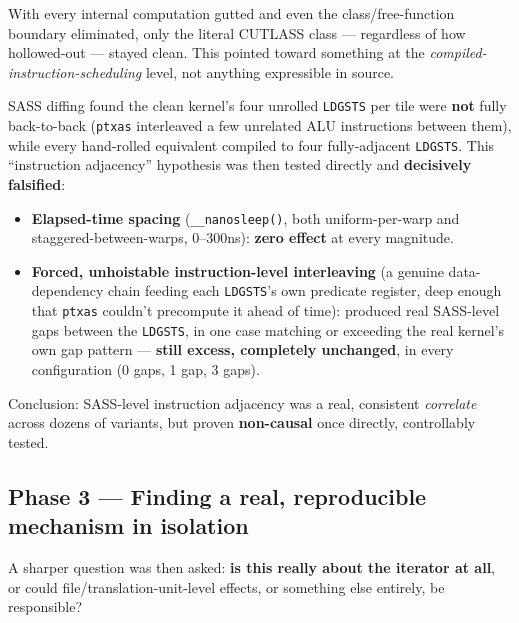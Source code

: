 \documentclass[11pt]{article}
\begin{document}
With every internal computation gutted and even the class/free-function boundary eliminated, only the literal CUTLASS class --- regardless of how hollowed-out --- stayed clean. This pointed toward something at the \emph{compiled-instruction-scheduling} level, not anything expressible in source.

SASS diffing found the clean kernel's four unrolled \texttt{LDGSTS} per tile were \textbf{not} fully back-to-back (\texttt{ptxas} interleaved a few unrelated ALU instructions between them), while every hand-rolled equivalent compiled to four fully-adjacent \texttt{LDGSTS}. This ``instruction adjacency'' hypothesis was then tested directly and \textbf{decisively falsified}:

\begin{itemize}
\item \textbf{Elapsed-time spacing} (\texttt{\_\_nanosleep()}, both uniform-per-warp and staggered-between-warps, 0--300ns): \textbf{zero effect} at every magnitude.
\item \textbf{Forced, unhoistable instruction-level interleaving} (a genuine data-dependency chain feeding each \texttt{LDGSTS}'s own predicate register, deep enough that \texttt{ptxas} couldn't precompute it ahead of time): produced real SASS-level gaps between the \texttt{LDGSTS}, in one case matching or exceeding the real kernel's own gap pattern --- \textbf{still excess, completely unchanged}, in every configuration (0 gaps, 1 gap, 3 gaps).
\end{itemize}

Conclusion: SASS-level instruction adjacency was a real, consistent \emph{correlate} across dozens of variants, but proven \textbf{non-causal} once directly, controllably tested.

\subsection{Phase 3 --- Finding a real, reproducible mechanism in isolation}

A sharper question was then asked: \textbf{is this really about the iterator at all}, or could file/translation-unit-level effects, or something else entirely, be responsible?
\end{document}
